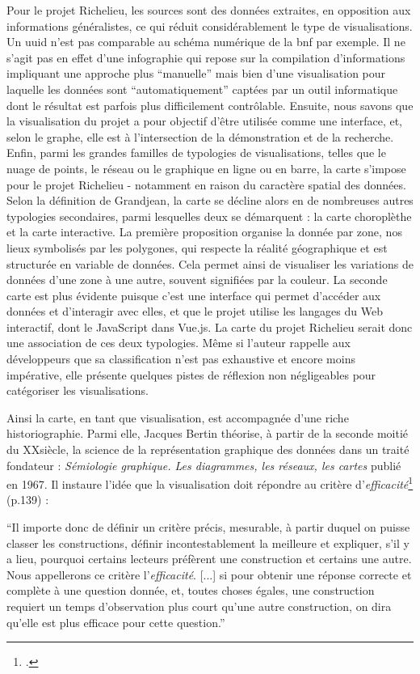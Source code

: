 Pour le projet Richelieu, les sources sont des données extraites, en opposition aux informations généralistes, ce qui réduit considérablement le type de visualisations. Un \acrshort{uuid} n'est pas comparable au schéma numérique de la \acrshort{bnf} par exemple. Il ne s'agit pas en effet d'une infographie qui repose sur la compilation d'informations impliquant une approche plus \enquote{manuelle} mais bien d'une visualisation pour laquelle les données sont \enquote{automatiquement} captées par un outil informatique dont le résultat est parfois plus difficilement contrôlable. Ensuite, nous savons que la visualisation du projet a pour objectif d'être utilisée comme une interface, et, selon le graphe, elle est à l'intersection de la démonstration et de la recherche. Enfin, parmi les grandes familles de typologies de visualisations, telles que le nuage de points, le réseau ou le graphique en ligne ou en barre, la carte s'impose pour le projet Richelieu - notamment en raison du caractère spatial des données. Selon la définition de Grandjean, la carte se décline alors  en de nombreuses autres typologies secondaires, parmi lesquelles deux se démarquent : la carte choroplèthe et la carte interactive. La première proposition organise la donnée par zone, nos lieux symbolisés par les polygones, qui respecte la réalité géographique et est structurée en variable de données. Cela permet ainsi de visualiser les variations de données d'une zone à une autre, souvent signifiées par la couleur. La seconde carte est plus évidente puisque c'est une interface qui permet d'accéder aux données et d'interagir avec elles, et que le projet utilise les langages du Web interactif, dont le JavaScript dans Vue.js. La carte du projet Richelieu serait donc une association de ces deux typologies. Même si l'auteur rappelle aux développeurs que sa classification n'est pas exhaustive et encore moins impérative, elle présente quelques pistes de réflexion non négligeables pour catégoriser les visualisations. 

Ainsi la carte, en tant que visualisation, est accompagnée d'une riche historiographie. Parmi elle, Jacques Bertin théorise, à partir de la seconde moitié du XX\ieme siècle, la science de la représentation graphique des données dans un traité fondateur : \textit{Sémiologie graphique. Les diagrammes, les réseaux, les cartes} publié en 1967. Il instaure l'idée que la visualisation doit répondre au critère d'\textit{efficacité}\footcite{BERTINSemiologie1967} (p.139) : 
\begin{displayquote}\enquote{Il importe donc de définir un critère précis, mesurable, à partir duquel on puisse classer les constructions, définir incontestablement la meilleure et expliquer, s’il y a lieu, pourquoi certains lecteurs préfèrent une construction et certains une autre. Nous appellerons ce critère l'\textit{efficacité}. [...] si pour obtenir une réponse correcte et complète à une question donnée, et, toutes choses égales, une construction requiert un temps d’observation plus court qu’une autre construction, on dira qu’elle est plus efficace pour cette question.}
\end{displayquote}

